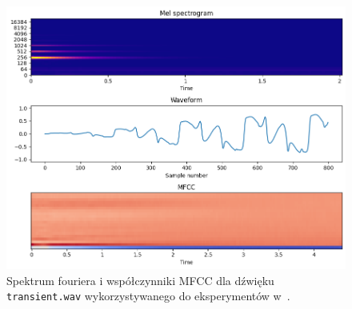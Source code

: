 \begin{figure}[H]
    \centering
    \includegraphics[width=0.7\linewidth]{rys06/transient_sample_literature.png}
    \caption{
      Spektrum fouriera i współczynniki MFCC dla dźwięku \texttt{transient.wav} wykorzystywanego
      do eksperymentów w~\cite{evolutionary_puredata_results}.
    }\label{fig:literature_transient_sound_overview}
\end{figure}



